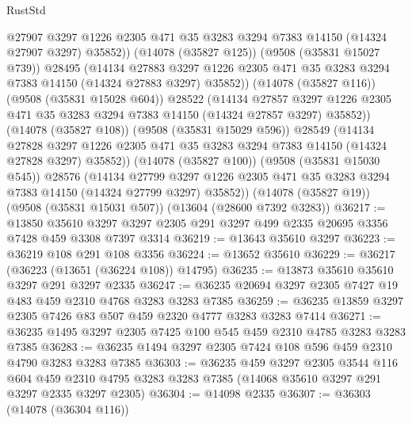 \begin{lexlean}{RustStd}
\begin{coremodule}
                @27907
                @3297
                @1226
                @2305
                @471
                @35
                @3283
                @3294
                @7383
                @14150
                (@14324 @27907 @3297)
                @35852))
            (@14078 (@35827 @125))
            (@9508 (@35831 @15027 @739))
            @28495
            (@14134
              @27883
              @3297
              @1226
              @2305
              @471
              @35
              @3283
              @3294
              @7383
              @14150
              (@14324 @27883 @3297)
              @35852))
          (@14078 (@35827 @116))
          (@9508 (@35831 @15028 @604))
          @28522
          (@14134
            @27857
            @3297
            @1226
            @2305
            @471
            @35
            @3283
            @3294
            @7383
            @14150
            (@14324 @27857 @3297)
            @35852))
        (@14078 (@35827 @108))
        (@9508 (@35831 @15029 @596))
        @28549
        (@14134
          @27828
          @3297
          @1226
          @2305
          @471
          @35
          @3283
          @3294
          @7383
          @14150
          (@14324 @27828 @3297)
          @35852))
      (@14078 (@35827 @100))
      (@9508 (@35831 @15030 @545))
      @28576
      (@14134
        @27799
        @3297
        @1226
        @2305
        @471
        @35
        @3283
        @3294
        @7383
        @14150
        (@14324 @27799 @3297)
        @35852))
    (@14078 (@35827 @19))
    (@9508 (@35831 @15031 @507))
    (@13604 (@28600 @7392 @3283))
@36217 := @13850
    @35610
    @3297
    @3297
    @2305
    @291
    @3297
    @499
    @2335
    @20695
    @3356
    @7428
    @459
    @3308
    @7397
    @3314
@36219 := @13643 @35610 @3297
@36223 := @36219 @108 @291 @108 @3356
@36224 := @13652 @35610
@36229 := @36217 (@36223 (@13651 (@36224 @108)) @14795)
@36235 := @13873 @35610 @35610 @3297 @291 @3297 @2335
@36247 := @36235 @20694 @3297 @2305 @7427 @19 @483 @459 @2310 @4768 @3283 @3283 @7385
@36259 := @36235 @13859 @3297 @2305 @7426 @83 @507 @459 @2320 @4777 @3283 @3283 @7414
@36271 := @36235 @1495 @3297 @2305 @7425 @100 @545 @459 @2310 @4785 @3283 @3283 @7385
@36283 := @36235 @1494 @3297 @2305 @7424 @108 @596 @459 @2310 @4790 @3283 @3283 @7385
@36303 := @36235
    @459
    @3297
    @2305
    @3544
    @116
    @604
    @459
    @2310
    @4795
    @3283
    @3283
    @7385
    (@14068 @35610 @3297 @291 @3297 @2335 @3297 @2305)
@36304 := @14098 @2335
@36307 := @36303 (@14078 (@36304 @116))

\end{coremodule}
\end{lexlean}
